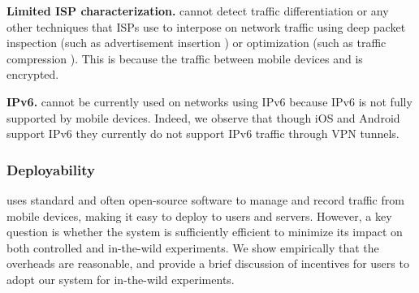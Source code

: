 \noindent\textbf{Limited ISP characterization.} \platname{} cannot detect traffic 
differentiation or any other techniques that ISPs use to interpose on network 
traffic using deep packet inspection (such as
advertisement insertion ) or optimization
(such as traffic compression ). This is because the traffic between mobile devices and \platname{}
is encrypted.

\noindent\textbf{IPv6.} \platname{} cannot be currently used on networks using IPv6
because IPv6 is not fully supported by mobile devices. Indeed, we
observe that though iOS and Android support IPv6 they currently do not
support IPv6 traffic through VPN tunnels.


\subsubsection{Deployability}
\platname{} uses standard and often open-source software to manage and
record traffic from mobile devices, making it easy to deploy to users
and servers. However, a key question is whether the system is
sufficiently efficient to minimize its impact on both controlled and
in-the-wild experiments. We show empirically that the overheads are
reasonable, and provide a brief discussion of incentives for users to
adopt our system for in-the-wild experiments.

